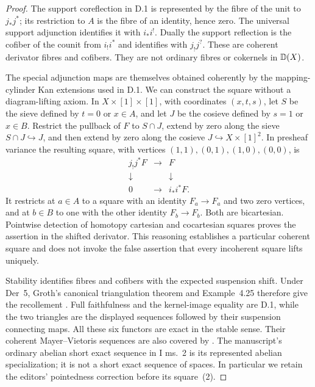 \begin{proof}
The support coreflection in D.1 is represented by the fibre of the unit to $j_*j^*$; its restriction to $A$ is the fibre of an identity, hence zero. The universal support adjunction identifies it with $i_*i^!$. Dually the support reflection is the cofiber of the counit from $i_!i^*$ and identifies with $j_!j^?$. These are coherent derivator fibres and cofibers. They are not ordinary fibres or cokernels in $\mathbb D(X)$.

The special adjunction maps are themselves obtained coherently by the mapping-cylinder Kan extensions used in D.1. We can construct the square without a diagram-lifting axiom. In $X\times[1]\times[1]$, with coordinates $(x,t,s)$, let $S$ be the sieve defined by $t=0$ or $x\in A$, and let $J$ be the cosieve defined by $s=1$ or $x\in B$. Restrict the pullback of $F$ to $S\cap J$, extend by zero along the sieve $S\cap J\hookrightarrow J$, and then extend by zero along the cosieve $J\hookrightarrow X\times[1]^2$. In presheaf variance the resulting square, with vertices $(1,1),(0,1),(1,0),(0,0)$, is
\[
\begin{array}{ccc}
j_!j^*F&\longrightarrow&F\\
\downarrow&&\downarrow\\
0&\longrightarrow&i_*i^*F.
\end{array}
\]
It restricts at $a\in A$ to a square with an identity $F_a\to F_a$ and two zero vertices, and at $b\in B$ to one with the other identity $F_b\to F_b$. Both are bicartesian. Pointwise detection of homotopy cartesian and cocartesian squares proves the assertion in the shifted derivator. This reasoning establishes a particular coherent square and does not invoke the false assertion that every incoherent square lifts uniquely.

Stability identifies fibres and cofibers with the expected suspension shift. Under Der~5, Groth's canonical triangulation theorem and Example~4.25 therefore give the recollement \citep[Theorem~4.16, \S4.3]{CDGroth2013}. Full faithfulness and the kernel-image equality are D.1, while the two triangles are the displayed sequences followed by their suspension connecting maps. All these six functors are exact in the stable sense. Their coherent Mayer--Vietoris sequences are also covered by \citet[Theorem~6.1]{CDGPS2014}. The manuscript's ordinary abelian short exact sequence in I ms.~2 is its represented abelian specialization; it is not a short exact sequence of spaces. In particular we retain the editors' pointedness correction before its square~(2).
\end{proof}

